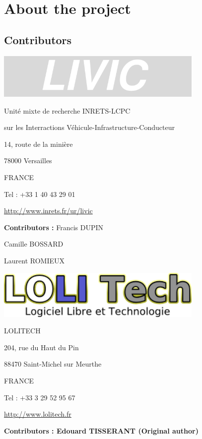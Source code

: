 \documentclass[a4paper,12pt]{book}
\begin{document}
\clearpage\section{About the project}
\subsection{Contributors }
 \begin{center}
   \includegraphics[width=10cm]{Pictures/1000020100000258000000832C6FFAB4.png}
\end{center}

Unit\'e mixte de recherche INRETS{}-LCPC

sur les Interractions V\'ehicule{}-Infrastructure{}-Conducteur

14, route de la mini\`ere

78000 Versailles

FRANCE

Tel : +33 1 40 43 29 01

\href{http://www.inrets.fr/ur/livic}{http://www.inrets.fr/ur/livic}

\textbf{Contributors :} Francis DUPIN

   Camille BOSSARD

   Laurent ROMIEUX


\bigskip

 \begin{center}
   \includegraphics[width=10cm]{Pictures/100002010000013A0000004A96B0C1FF.png}
\end{center}

LOLITECH

204, rue du Haut du Pin

88470 Saint{}-Michel sur Meurthe

FRANCE

Tel : +33 3 29 52 95 67

\href{http://www.lolitech.fr/}{http://www.lolitech.fr}

{\bfseries
Contributors : \textmd{Edouard TISSERANT (Original author)}}
\end{document}
